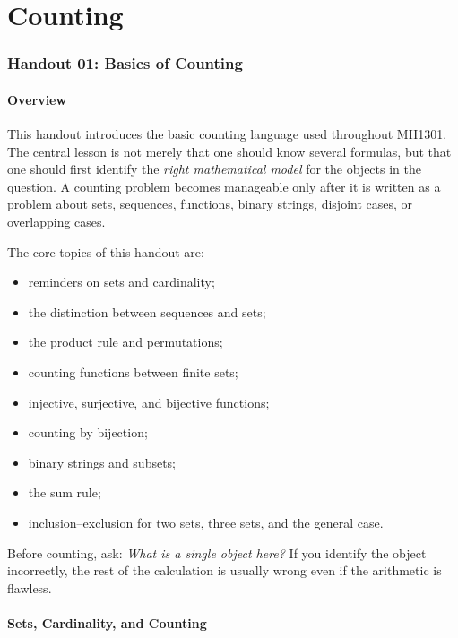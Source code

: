 \part{Counting}
\section{Handout 01: Basics of Counting}

\subsection{Overview}

This handout introduces the basic counting language used throughout MH1301. The central lesson is not merely that one should know several formulas, but that one should first identify the \emph{right mathematical model} for the objects in the question. A counting problem becomes manageable only after it is written as a problem about sets, sequences, functions, binary strings, disjoint cases, or overlapping cases.

The core topics of this handout are:
\begin{itemize}[leftmargin=*]
    \item reminders on sets and cardinality;
    \item the distinction between sequences and sets;
    \item the product rule and permutations;
    \item counting functions between finite sets;
    \item injective, surjective, and bijective functions;
    \item counting by bijection;
    \item binary strings and subsets;
    \item the sum rule;
    \item inclusion--exclusion for two sets, three sets, and the general case.
\end{itemize}

\begin{examtip}[title={The guiding question of Handout 01}]
Before counting, ask: \emph{What is a single object here?} If you identify the object incorrectly, the rest of the calculation is usually wrong even if the arithmetic is flawless.
\end{examtip}

\subsection{Sets, Cardinality, and Counting}

